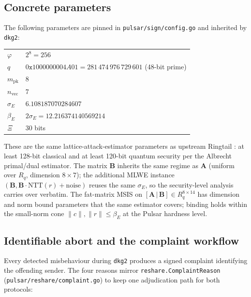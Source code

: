 \subsection{Concrete parameters}
\label{ssec:pedersen-params}

The following parameters are pinned in \texttt{pulsar/sign/config.go}
and inherited by \texttt{dkg2}:

\begin{tabular}{ll}
\toprule
$\varphi$           & $2^8 = 256$ \\
$q$                 & $0\mathtt{x}1000000004A01 = 281\,474\,976\,729\,601$ (48-bit prime) \\
$m_{\textrm{pk}}$   & $8$ \\
$n_{\textrm{vec}}$  & $7$ \\
$\sigma_E$          & $6.108187070284607$ \\
$\beta_E$           & $2\sigma_E = 12.216374140569214$ \\
$\Xi$               & $30$ bits \\
\bottomrule
\end{tabular}

These are the same lattice-attack-estimator parameters as upstream
Ringtail \cite{ringtail}: at least 128-bit classical and at least
120-bit quantum security per the Albrecht primal/dual estimator. The
matrix $\mathbf{B}$ inherits the same regime as $\mathbf{A}$
(uniform over $R_q$, dimension $8\times 7$); the additional MLWE
instance $(\mathbf{B}, \mathbf{B}\cdot\mathrm{NTT}(r) + \mathrm{noise})$
reuses the same $\sigma_E$, so the security-level analysis carries
over verbatim. The fat-matrix MSIS on
$[\mathbf{A}\,|\,\mathbf{B}]\in R_q^{8\times 14}$ has dimension and
norm bound parameters that the same estimator covers; binding holds
within the small-norm cone $\|c\|,\|r\|\le\beta_E$ at the Pulsar
hardness level.

\subsection{Identifiable abort and the complaint workflow}
\label{ssec:pedersen-complaint}

Every detected misbehaviour during \texttt{dkg2} produces a signed
complaint identifying the offending sender. The four reasons mirror
\texttt{reshare.ComplaintReason} (\texttt{pulsar/reshare/complaint.go})
to keep one adjudication path for both protocols:

